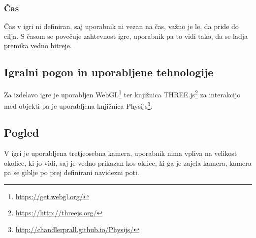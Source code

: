 \documentclass[a4paper]{article}
\begin{document}
\subsubsection{\v Cas}
\v Cas v igri ni definiran, saj uporabnik ni vezan na \v cas, va\v zno je le, da pride do cilja. S \v casom se pove\v cuje zahtevnost igre, uporabnik pa to vidi tako, da se ladja premika vedno hitreje.

\subsection{Igralni pogon in uporabljene tehnologije}
Za izdelavo igre je uporabljen WebGL\footnote{\url{https://get.webgl.org/}} ter knji\v znica THREE.js\footnote{\url{https://http://threejs.org/}} za interakcijo med objekti pa je uporabljena knji\v znica Physijs\footnote{\url{http://chandlerprall.github.io/Physijs/}}.

\subsection{Pogled}
V igri je uporabljena tretjeosebna kamera, uporabnik nima vpliva na velikost okolice, ki jo vidi, saj je vedno prikazan kos oklice, ki ga je zajela kamera, kamera pa se giblje po prej definirani navidezni poti.


\small


\end{document}
